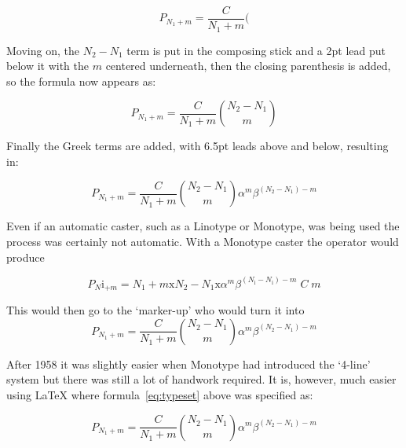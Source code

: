 \documentclass[10pt,letterpaper,extrafontsizes]{memoir}
\begin{document}
\begin{displaymath}
P_{N_1 + m} = \frac{C}{N_{1} + m} \bigg(
\end{displaymath}

   Moving on, the $N_{2}-N_{1}$ term is put in the composing stick and a 2pt
lead put below it with the $m$ centered underneath, then the closing parenthesis
is added, so the formula now appears as:

\begin{displaymath}
P_{N_1 + m} = \frac{C}{N_{1} + m} \binom{N_{2} - N_{1}}{m}
\end{displaymath}
 
    Finally the Greek terms are added, with 6.5pt leads above and below, 
resulting in:

\begin{displaymath}
P_{N_1 + m} = \frac{C}{N_{1} + m} \binom{N_{2} - N_{1}}{m}
              \alpha^{m}\beta^{(N_{2}-N_{1}) - m}
\end{displaymath}

    Even if an automatic caster, such as a Linotype or Monotype, was being 
used the process was certainly not automatic. With a 
Monotype caster the 
operator would produce

\providecommand*{\tmri}{\mathrm{i}}
\providecommand*{\tmrx}{\mathrm{x}}
\begin{displaymath}
P_{N}\tmri_{+m} = N_{1} + m\tmrx N_{2}-N_{1}\tmrx \alpha^{m}\beta^{(N_{\tmri}-N_{\tmri}) - m} \; C \; m
\end{displaymath}

This would then go to the `marker-up' who would turn it into
\begin{displaymath}
P_{N_1 + m} = \frac{C}{N_{1} + m} \binom{N_{2} - N_{1}}{m}
              \alpha^{m}\beta^{(N_{2}-N_{1}) - m}
\end{displaymath}

After 1958 it was slightly easier when Monotype had introduced the 
`4-line' system but there was still a lot of handwork required. 
It is, however, much easier using LaTeX where 
formula~\ref{eq:typeset} above was specified as:
\begin{lcode}
\begin{equation}
P_{N_1 + m} = \frac{C}{N_{1} + m} \binom{N_{2} - N_{1}}{m}
              \alpha^{m}\beta^{(N_{2}-N_{1}) - m}
\end{equation}
\end{lcode}

\end{document}
